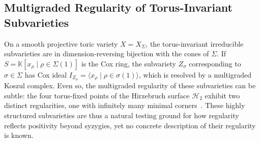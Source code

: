 \documentclass[11pt,reqno]{amsart}
\theoremstyle{remark}
\newcommand{\KK}{\mathbb{K}}
\newcommand{\cH}{\mathcal{H}}
\newcommand{\cM}{\mathcal{M}}
\newcommand{\cO}{\mathcal{O}}
\newcommand{\juliette}[1]{{\color{red} \sf $\spadesuit\spadesuit\spadesuit$ Juliette: [#1]}}
\begin{document}
%

 \subsection{Multigraded Regularity of Torus-Invariant Subvarieties}
 
On a smooth projective toric variety $X = X_\Sigma$, the torus-invariant irreducible subvarieties are in dimension-reversing bijection with the cones of $\Sigma$. If $S=\KK[x_\rho \mid \rho\in \Sigma(1)]$ is the Cox ring, the subvariety $Z_\sigma$ corresponding to $\sigma\in\Sigma$ has Cox ideal $I_{Z_\sigma} = \langle x_\rho \mid \rho \in \sigma(1) \rangle$, which is resolved by a multigraded Koszul complex. Even so, the multigraded regularity of these subvarieties can be subtle: the four torus-fixed points of the Hirzebruch surface $\cH_2$ exhibit two distinct regularities, one with infinitely many minimal corners~\cite{bruceHellerSayrafi22}. These highly structured subvarieties are thus a natural testing ground for how regularity reflects positivity beyond syzygies, yet no concrete description of their regularity is known.
\end{document}
